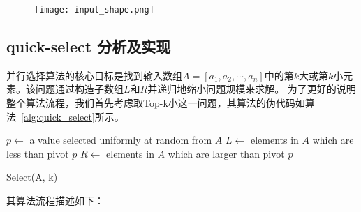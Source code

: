 \begin{figure}[ht]
    \centering
    \texttt{[image: input\_shape.png]}
    \caption{}
    \label{fig:input_shape}
\end{figure}



    \subsection{quick-select 分析及实现}
    并行选择算法的核心目标是找到输入数组\(A = [a_{1}, a_{2},\cdots, a_{n}]\)中的第\(k\)大或第\(k\)小元素。该问题通过构造子数组\(L\)和\(R\)并递归地缩小问题规模来求解。
    为了更好的说明整个算法流程，我们首先考虑取Top-k小这一问题，其算法的伪代码如算法~\ref{alg:quick_select}所示。
    
    
    \begin{algorithm}
        \SetAlgoLined
        $p \leftarrow$ a value selected uniformly at random from $A$ 
        $L \leftarrow$ elements in $A$ which are less than pivot $p$ 
        $R \leftarrow$ elements in $A$ which are larger than pivot $p$\\
        \caption{Select(A, k)}
        \label{alg:quick_select}
    \end{algorithm}

    其算法流程描述如下：

